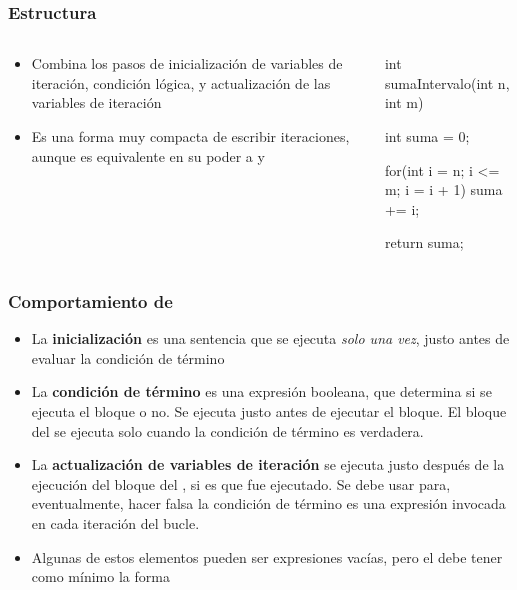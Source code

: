 \documentclass{beamer}
\begin{document}
\begin{frame}[fragile]
  \frametitle{Estructura }

  \begin{columns}
    \begin{column}{0.4\textwidth}
      \begin{itemize}
        
      \item Combina los pasos de inicialización de variables de
        iteración, condición lógica, y actualización de las variables
        de iteración
        
      \item Es una forma muy compacta de escribir iteraciones, aunque
        es equivalente en su poder a  y 

      \end{itemize}      
    \end{column}
    \begin{column}{0.6\textwidth}
\begin{jsmall}
        int sumaIntervalo(int n, int m) {
          int suma = 0;

          for(int i = n; i <= m; i = i + 1) {
            suma += i;
          }
          
          return suma;
        }
\end{jsmall}
    \end{column}
  \end{columns}

\end{frame}

\begin{frame}[fragile]
  \frametitle{Comportamiento de }

  \begin{itemize}
  \item La \textbf{inicialización} es una sentencia que se ejecuta \emph{solo una vez}, justo antes de evaluar la condición de término

  \item La \textbf{condición de término} es una expresión booleana,
    que determina si se ejecuta el bloque o no. Se ejecuta justo antes
    de ejecutar el bloque. El bloque del  se ejecuta solo
    cuando la condición de término es verdadera.    

  \item La \textbf{actualización de variables de iteración} se ejecuta
    justo después de la ejecución del bloque del , si es
    que fue ejecutado. Se debe usar para, eventualmente, hacer falsa
    la condición de término es una expresión invocada en cada iteración del bucle.

  \item Algunas de estos elementos pueden ser expresiones vacías, pero
    el  debe tener como mínimo la forma 
  \end{itemize}
\end{frame}
\end{document}
